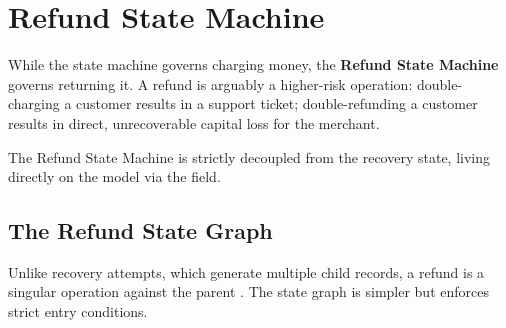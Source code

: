 
\section{Refund State Machine}

\begin{tcolorbox}[summarybox={\iconFlow[1.5] Reversing the Transaction}]
\color{textdark}
While the  state machine governs charging money, the \textbf{Refund State Machine} governs returning it. A refund is arguably a higher-risk operation: double-charging a customer results in a support ticket; double-refunding a customer results in direct, unrecoverable capital loss for the merchant.

The Refund State Machine is strictly decoupled from the recovery state, living directly on the  model via the  field.
\end{tcolorbox}

\vspace{0.8cm}

\subsection{The Refund State Graph}

Unlike recovery attempts, which generate multiple child records, a refund is a singular operation against the parent . The state graph is simpler but enforces strict entry conditions.

\vspace{0.5cm}

